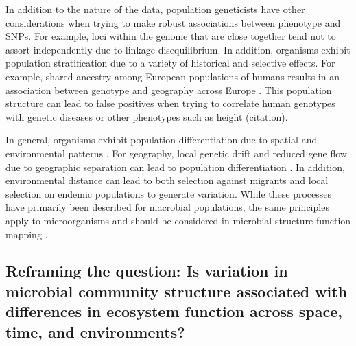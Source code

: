 \documentclass{article}
\begin{document}
In addition to the nature of the data, population geneticists have other
considerations when trying to make robust associations between phenotype
and SNPs. For example, loci within the genome that are close together tend
not to assort independently due to linkage disequilibrium. In addition,
organisms exhibit population stratification due to a variety of historical
and selective effects. For example, shared ancestry among European
populations of humans results in an association between genotype and
geography across Europe \citep{novembre2008}. This population structure
can lead to false positives when trying to correlate human genotypes
with genetic diseases or other phenotypes such as height (citation).

In general, organisms exhibit population differentiation due to spatial
and environmental patterns \citep{wright1943}. For geography, local genetic
drift and reduced gene flow due to geographic separation can lead to population
differentiation \citep{wright1943}. In addition, environmental distance can lead to both selection
against migrants \citep{hendry2004} and local selection on endemic populations to
generate variation. While
these processes have primarily been described for macrobial populations, the
same principles apply to microorganisms and should be considered
in microbial structure-function mapping \citep{martiny2006}. 

\subsection{Reframing the question: Is variation in microbial community
structure associated with differences in ecosystem function across space,
time, and environments?}
\end{document}
